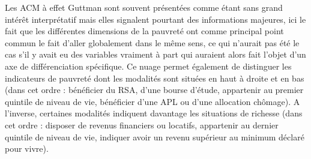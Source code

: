 \documentclass[12pt,a4paper]{reedthesis}
\begin{document}
Les ACM à effet Guttman sont souvent présentées comme étant sans grand intérêt interprétatif mais elles signalent pourtant des informations majeures, ici le fait que les différentes dimensions de la pauvreté ont comme principal point commun le fait d'aller globalement dans le même sens, ce qui n'aurait pas été le cas s'il y avait eu des variables vraiment à part qui auraient alors fait l'objet d'un axe de différenciation spécifique. Ce nuage permet également de distinguer les indicateurs de pauvreté dont les modalités sont situées en haut à droite et en bas (dans cet ordre : bénéficier du RSA, d'une bourse d'étude, appartenir au premier quintile de niveau de vie, bénéficier d'une APL ou d'une allocation chômage). A l'inverse, certaines modalités indiquent davantage les situations de richesse (dans cet ordre : disposer de revenus financiers ou locatifs, appartenir au dernier quintile de niveau de vie, indiquer avoir un revenu supérieur au minimum déclaré pour vivre).
\end{document}
